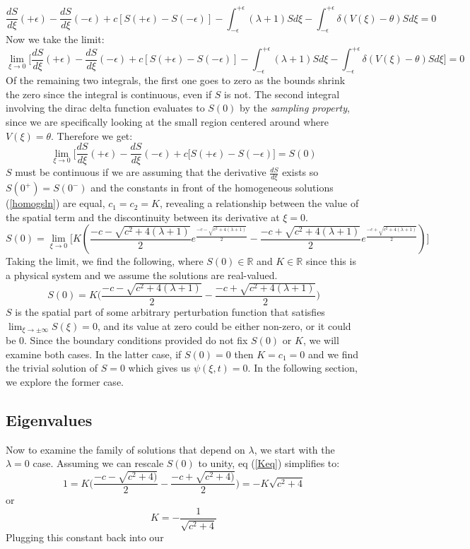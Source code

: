 \documentclass[12pt]{article}
\begin{document}
$$ \frac{dS}{d\xi}(+\epsilon) - \frac{dS}{d\xi}(-\epsilon) + c[S(+\epsilon) - S(-\epsilon)] - \int_{-\epsilon}^{+\epsilon}(\lambda + 1)Sd\xi - \int_{-\epsilon}^{+\epsilon}\delta(V(\xi)-\theta)Sd\xi = 0 $$
Now we take the limit:
$$ \lim_{\xi \to 0} \Bigg[ \frac{dS}{d\xi}(+\epsilon) - \frac{dS}{d\xi}(-\epsilon) + c[S(+\epsilon) - S(-\epsilon)] - \int_{-\epsilon}^{+\epsilon}(\lambda + 1)Sd\xi - \int_{-\epsilon}^{+\epsilon}\delta(V(\xi)-\theta)Sd\xi \Bigg]= 0 $$
Of the remaining two integrals, the first one goes to zero as the bounds shrink the zero since the integral is continuous, even if $S$ is not. The second integral involving the dirac delta function evaluates to $S(0)$ by the \textit{sampling property}, since we are specifically looking at the small region centered around where $V(\xi) = \theta$. Therefore we get:
$$ \lim_{\xi \to 0} \Bigg[ \frac{dS}{d\xi}(+\epsilon) - \frac{dS}{d\xi}(-\epsilon) + c[S(+\epsilon) - S(-\epsilon) \Bigg] = S(0) $$
$S$ must be continuous if we are assuming that the derivative $\frac{dS}{d\xi}$ exists so $S(0^+) = S(0^-)$ and the constants in front of the homogeneous solutions (\ref{homogsln}) are equal, $c_1 = c_2 = K$, revealing a relationship between the value of the spatial term and the discontinuity between its derivative at $\xi=0$.
$$ S(0) = \lim_{\xi \to 0} \Bigg[ K(\frac{-c-\sqrt{c^2+4(\lambda+1)}}{2}e^{\frac{-c-\sqrt{c^2+4(\lambda+1)}}{2}} - \frac{-c+\sqrt{c^2+4(\lambda+1)}}{2}e^{\frac{-c+\sqrt{c^2+4(\lambda+1)}}{2}})\Bigg] $$
Taking the limit, we find the following, where $S(0)\in \mathbb{R}$ and $K\in\mathbb{R}$ since this is a physical system and we assume the solutions are real-valued.
\begin{equation}\label{Keq}
S(0) = K\Bigg(\frac{-c-\sqrt{c^2+4(\lambda+1)}}{2} - \frac{-c+\sqrt{c^2+4(\lambda+1)}}{2} \Bigg)
\end{equation}
$S$ is the spatial part of some arbitrary perturbation function that satisfies $\lim_{\xi \to \pm \infty}S(\xi) = 0$, and its value at zero could be either non-zero, or it could be 0. Since the boundary conditions provided do not fix $S(0)$ or $K$, we will examine both cases. In the latter case, if $S(0) = 0$ then $K=c_1=0$ and we find the trivial solution of $S=0$ which gives us $\psi(\xi,t) = 0$. In the following section, we explore the former case.


\subsection{Eigenvalues}
Now to examine the family of solutions that depend on $\lambda$, we start with the $\lambda = 0$ case. Assuming we can rescale $S(0)$ to unity, eq (\ref{Keq}) simplifies to:
$$1 = K\Bigg(\frac{-c-\sqrt{c^2+4)}}{2} - \frac{-c+\sqrt{c^2+4)}}{2}\Bigg) = -K\sqrt{c^2+4} $$
or
$$K = -\frac{1}{\sqrt{c^2+4}}$$
Plugging this constant back into our 
\end{document}
